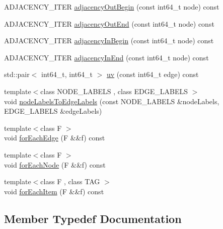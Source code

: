\begin{DoxyCompactItemize}
A\+D\+J\+A\+C\+E\+N\+C\+Y\+\_\+\+I\+T\+E\+R \hyperlink{classnifty_1_1graph_1_1UndirectedGraphBase_a5cf3ab2489af9ab2c93ee5f27ab317ef}{adjacency\+Out\+Begin} (const int64\+\_\+t node) const 
\item 
A\+D\+J\+A\+C\+E\+N\+C\+Y\+\_\+\+I\+T\+E\+R \hyperlink{classnifty_1_1graph_1_1UndirectedGraphBase_ae4b6e4c05d4a6cdefaa74e4d320763bd}{adjacency\+Out\+End} (const int64\+\_\+t node) const 
\item 
A\+D\+J\+A\+C\+E\+N\+C\+Y\+\_\+\+I\+T\+E\+R \hyperlink{classnifty_1_1graph_1_1UndirectedGraphBase_a7afa033e4b12fcf61b51cd64d80c3c5a}{adjacency\+In\+Begin} (const int64\+\_\+t node) const 
\item 
A\+D\+J\+A\+C\+E\+N\+C\+Y\+\_\+\+I\+T\+E\+R \hyperlink{classnifty_1_1graph_1_1UndirectedGraphBase_ab07e2c9932aefe659b1b378462941ac3}{adjacency\+In\+End} (const int64\+\_\+t node) const 
\item 
std\+::pair$<$ int64\+\_\+t, int64\+\_\+t $>$ \hyperlink{classnifty_1_1graph_1_1UndirectedGraphBase_a06f985778f273042431f8389e471b4a5}{uv} (const int64\+\_\+t edge) const 
\item 
{\footnotesize template$<$class N\+O\+D\+E\+\_\+\+L\+A\+B\+E\+L\+S , class E\+D\+G\+E\+\_\+\+L\+A\+B\+E\+L\+S $>$ }\\void \hyperlink{classnifty_1_1graph_1_1UndirectedGraphBase_a4b3cb925bbce09bea0ceeede5c04c4a1}{node\+Labels\+To\+Edge\+Labels} (const N\+O\+D\+E\+\_\+\+L\+A\+B\+E\+L\+S \&node\+Labels, E\+D\+G\+E\+\_\+\+L\+A\+B\+E\+L\+S \&edge\+Labels)
\item 
{\footnotesize template$<$class F $>$ }\\void \hyperlink{classnifty_1_1graph_1_1UndirectedGraphBase_a6387a4da71c29ae1b61b9a78c00ba375}{for\+Each\+Edge} (F \&\&f) const 
\item 
{\footnotesize template$<$class F $>$ }\\void \hyperlink{classnifty_1_1graph_1_1UndirectedGraphBase_aee15f36b1966ca1dfb8f5a674e8fe7cc}{for\+Each\+Node} (F \&\&f) const 
\item 
{\footnotesize template$<$class F , class T\+A\+G $>$ }\\void \hyperlink{classnifty_1_1graph_1_1UndirectedGraphBase_a07dfaf6d9511301e6c8fcdc05a6ec358}{for\+Each\+Item} (F \&\&f) const 
\end{DoxyCompactItemize}


\subsection{Member Typedef Documentation}
\hypertarget{classnifty_1_1graph_1_1UndirectedGraphBase_af2541cf9fb91440ff0a7b56dd5a6be29}{}

